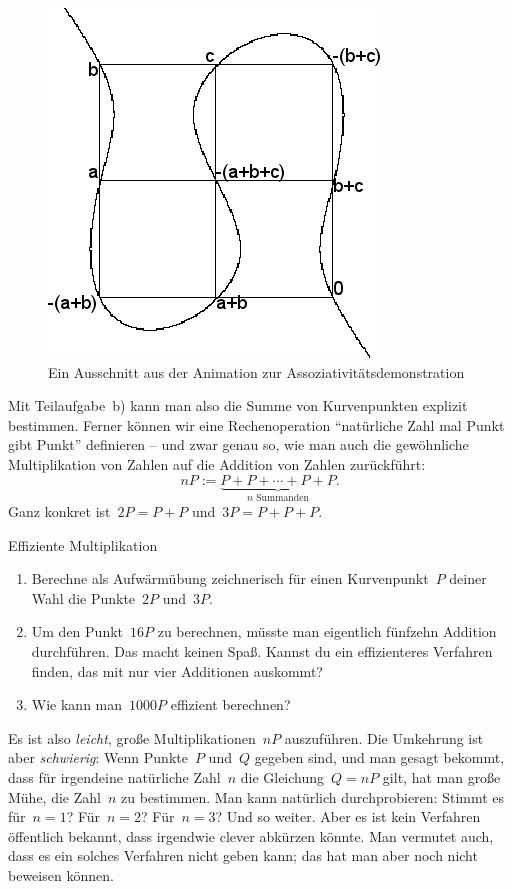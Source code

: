 \documentclass{../zirkelblatt}
\begin{document}
\begin{figure}[t]
  \centering
  \includegraphics[scale=0.4]{elliptic-curve-associativity}
  \caption{Ein Ausschnitt aus der Animation zur Assoziativitätsdemonstration}
\end{figure}

Mit Teilaufgabe~b) kann man also die Summe von Kurvenpunkten explizit
bestimmen. Ferner können wir eine Rechenoperation "`natürliche Zahl mal Punkt
gibt Punkt"' definieren -- und zwar genau so, wie man auch die gewöhnliche
Multiplikation von Zahlen auf die Addition von Zahlen zurückführt:
\[ n P := \underbrace{P + P + \cdots + P + P}_{\text{$n$ Summanden}}. \]
Ganz konkret ist~$2 P = P + P$ und~$3 P = P + P + P$.

\begin{aufgabeShaded}{Effiziente Multiplikation}
\begin{enumerate}
\item Berechne als Aufwärmübung zeichnerisch für einen Kurvenpunkt~$P$ deiner Wahl die
Punkte~$2P$ und~$3P$.
\item Um den Punkt~$16P$ zu berechnen, müsste man eigentlich fünfzehn Addition
durchführen. Das macht keinen Spaß. Kannst du ein effizienteres Verfahren
finden, das mit nur vier Additionen auskommt?
\item Wie kann man~$1000P$ effizient berechnen?
\end{enumerate}
\end{aufgabeShaded}

Es ist also \emph{leicht}, große Multiplikationen~$nP$ auszuführen. Die
Umkehrung ist aber \emph{schwierig}: Wenn Punkte~$P$ und~$Q$ gegeben sind, und
man gesagt bekommt, dass für irgendeine natürliche Zahl~$n$ die Gleichung~$Q =
nP$ gilt, hat man große Mühe, die Zahl~$n$ zu bestimmen. Man kann natürlich
durchprobieren: Stimmt es für~$n = 1$? Für~$n = 2$? Für~$n = 3$? Und so weiter.
Aber es ist kein Verfahren öffentlich bekannt, dass irgendwie clever abkürzen
könnte. Man vermutet auch, dass es ein solches Verfahren nicht geben kann; das
hat man aber noch nicht beweisen können.
\end{document}
